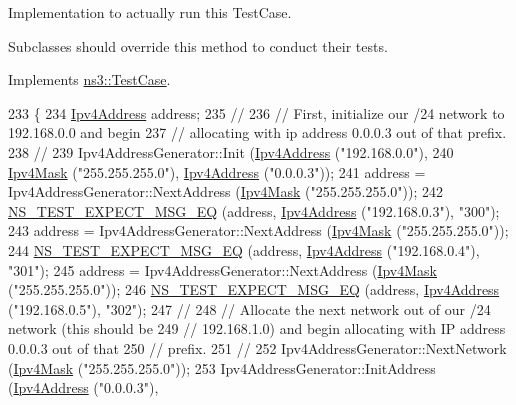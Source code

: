 Implementation to actually run this Test\+Case. 

Subclasses should override this method to conduct their tests. 

Implements \hyperlink{classns3_1_1TestCase_a8ff74680cf017ed42011e4be51917a24}{ns3\+::\+Test\+Case}.


\begin{DoxyCode}
233 \{
234   \hyperlink{classns3_1_1Ipv4Address}{Ipv4Address} address;
235   \textcolor{comment}{//}
236   \textcolor{comment}{// First, initialize our /24 network to 192.168.0.0 and begin }
237   \textcolor{comment}{// allocating with ip address 0.0.0.3 out of that prefix.}
238   \textcolor{comment}{//}
239   Ipv4AddressGenerator::Init (\hyperlink{classns3_1_1Ipv4Address}{Ipv4Address} (\textcolor{stringliteral}{"192.168.0.0"}),
240                               \hyperlink{classns3_1_1Ipv4Mask}{Ipv4Mask} (\textcolor{stringliteral}{"255.255.255.0"}), \hyperlink{classns3_1_1Ipv4Address}{Ipv4Address} (\textcolor{stringliteral}{"0.0.0.3"}));
241   address = Ipv4AddressGenerator::NextAddress (\hyperlink{classns3_1_1Ipv4Mask}{Ipv4Mask} (\textcolor{stringliteral}{"255.255.255.0"}));
242   \hyperlink{group__testing_ga7304ba46a28d8cf08dfdfd6499cf7068}{NS\_TEST\_EXPECT\_MSG\_EQ} (address, \hyperlink{classns3_1_1Ipv4Address}{Ipv4Address} (\textcolor{stringliteral}{"192.168.0.3"}), \textcolor{stringliteral}{"300"});
243   address = Ipv4AddressGenerator::NextAddress (\hyperlink{classns3_1_1Ipv4Mask}{Ipv4Mask} (\textcolor{stringliteral}{"255.255.255.0"}));
244   \hyperlink{group__testing_ga7304ba46a28d8cf08dfdfd6499cf7068}{NS\_TEST\_EXPECT\_MSG\_EQ} (address, \hyperlink{classns3_1_1Ipv4Address}{Ipv4Address} (\textcolor{stringliteral}{"192.168.0.4"}), \textcolor{stringliteral}{"301"});
245   address = Ipv4AddressGenerator::NextAddress (\hyperlink{classns3_1_1Ipv4Mask}{Ipv4Mask} (\textcolor{stringliteral}{"255.255.255.0"}));
246   \hyperlink{group__testing_ga7304ba46a28d8cf08dfdfd6499cf7068}{NS\_TEST\_EXPECT\_MSG\_EQ} (address, \hyperlink{classns3_1_1Ipv4Address}{Ipv4Address} (\textcolor{stringliteral}{"192.168.0.5"}), \textcolor{stringliteral}{"302"});
247   \textcolor{comment}{//}
248   \textcolor{comment}{// Allocate the next network out of our /24 network (this should be }
249   \textcolor{comment}{// 192.168.1.0) and begin allocating with IP address 0.0.0.3 out of that}
250   \textcolor{comment}{// prefix.}
251   \textcolor{comment}{//}
252   Ipv4AddressGenerator::NextNetwork (\hyperlink{classns3_1_1Ipv4Mask}{Ipv4Mask} (\textcolor{stringliteral}{"255.255.255.0"}));
253   Ipv4AddressGenerator::InitAddress (\hyperlink{classns3_1_1Ipv4Address}{Ipv4Address} (\textcolor{stringliteral}{"0.0.0.3"}),

\end{DoxyCode}
